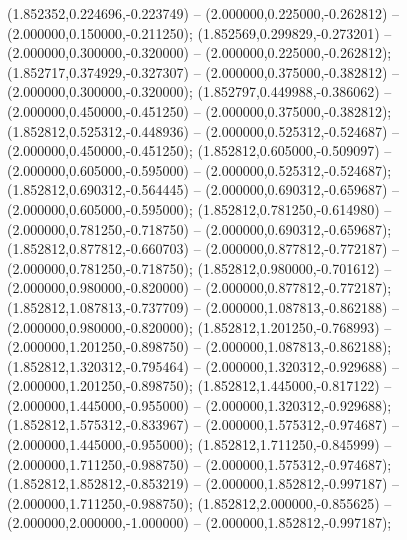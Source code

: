  (1.852352,0.224696,-0.223749) -- (2.000000,0.225000,-0.262812) -- (2.000000,0.150000,-0.211250);
 (1.852569,0.299829,-0.273201) -- (2.000000,0.300000,-0.320000) -- (2.000000,0.225000,-0.262812);
 (1.852717,0.374929,-0.327307) -- (2.000000,0.375000,-0.382812) -- (2.000000,0.300000,-0.320000);
 (1.852797,0.449988,-0.386062) -- (2.000000,0.450000,-0.451250) -- (2.000000,0.375000,-0.382812);
 (1.852812,0.525312,-0.448936) -- (2.000000,0.525312,-0.524687) -- (2.000000,0.450000,-0.451250);
 (1.852812,0.605000,-0.509097) -- (2.000000,0.605000,-0.595000) -- (2.000000,0.525312,-0.524687);
 (1.852812,0.690312,-0.564445) -- (2.000000,0.690312,-0.659687) -- (2.000000,0.605000,-0.595000);
 (1.852812,0.781250,-0.614980) -- (2.000000,0.781250,-0.718750) -- (2.000000,0.690312,-0.659687);
 (1.852812,0.877812,-0.660703) -- (2.000000,0.877812,-0.772187) -- (2.000000,0.781250,-0.718750);
 (1.852812,0.980000,-0.701612) -- (2.000000,0.980000,-0.820000) -- (2.000000,0.877812,-0.772187);
 (1.852812,1.087813,-0.737709) -- (2.000000,1.087813,-0.862188) -- (2.000000,0.980000,-0.820000);
 (1.852812,1.201250,-0.768993) -- (2.000000,1.201250,-0.898750) -- (2.000000,1.087813,-0.862188);
 (1.852812,1.320312,-0.795464) -- (2.000000,1.320312,-0.929688) -- (2.000000,1.201250,-0.898750);
 (1.852812,1.445000,-0.817122) -- (2.000000,1.445000,-0.955000) -- (2.000000,1.320312,-0.929688);
 (1.852812,1.575312,-0.833967) -- (2.000000,1.575312,-0.974687) -- (2.000000,1.445000,-0.955000);
 (1.852812,1.711250,-0.845999) -- (2.000000,1.711250,-0.988750) -- (2.000000,1.575312,-0.974687);
 (1.852812,1.852812,-0.853219) -- (2.000000,1.852812,-0.997187) -- (2.000000,1.711250,-0.988750);
 (1.852812,2.000000,-0.855625) -- (2.000000,2.000000,-1.000000) -- (2.000000,1.852812,-0.997187);
